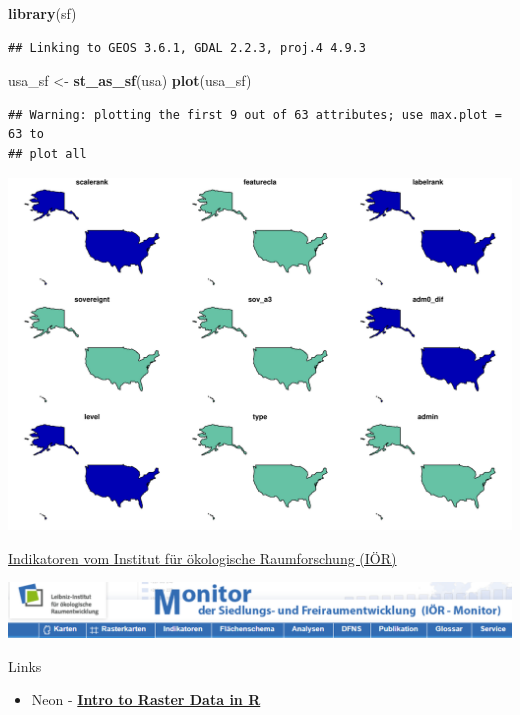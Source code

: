 \documentclass[ignorenonframetext,]{beamer}
\newenvironment{Shaded}{\begin{snugshade}}{\end{snugshade}}
\newcommand{\KeywordTok}[1]{\textcolor[rgb]{0.13,0.29,0.53}{\textbf{#1}}}
\newcommand{\NormalTok}[1]{#1}
\newcommand{\StringTok}[1]{\textcolor[rgb]{0.31,0.60,0.02}{#1}}
\providecommand{\tightlist}{%
  \setlength{\itemsep}{0pt}\setlength{\parskip}{0pt}}
\begin{document}
\begin{frame}[fragile]{\href{https://geocompr.robinlovelace.net/read-write.html}{}}
\protect\hypertarget{section-1}{}

\begin{Shaded}
\begin{Highlighting}[]
\KeywordTok{library}\NormalTok{(sf)}
\end{Highlighting}
\end{Shaded}

\begin{verbatim}
## Linking to GEOS 3.6.1, GDAL 2.2.3, proj.4 4.9.3
\end{verbatim}

\begin{Shaded}
\begin{Highlighting}[]
\NormalTok{usa_sf <-}\StringTok{ }\KeywordTok{st_as_sf}\NormalTok{(usa)}
\KeywordTok{plot}\NormalTok{(usa_sf)}
\end{Highlighting}
\end{Shaded}

\begin{verbatim}
## Warning: plotting the first 9 out of 63 attributes; use max.plot = 63 to
## plot all
\end{verbatim}

\includegraphics{A8_Rasterdaten_files/figure-beamer/unnamed-chunk-8-1.pdf}

\end{frame}

\begin{frame}{\href{http://www.ioer-monitor.de/}{Indikatoren vom
Institut für ökologische Raumforschung (IÖR)}}
\protect\hypertarget{indikatoren-vom-institut-fur-okologische-raumforschung-ior}{}

\includegraphics{figure/ioermonitor.PNG}

\end{frame}

\begin{frame}{Links}
\protect\hypertarget{links}{}

\begin{itemize}
\tightlist
\item
  Neon -
  \href{https://www.neonscience.org/dc-raster-data-r}{\textbf{Intro to
  Raster Data in R}}
\end{itemize}

\end{frame}
\end{document}
